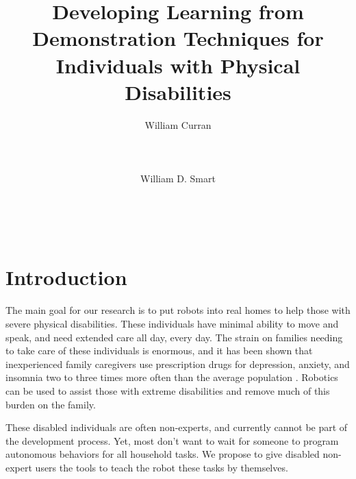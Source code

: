 \documentclass{sig-alternate}
\begin{document}

\title{Developing Learning from Demonstration Techniques for Individuals with Physical Disabilities}

\author{
  \alignauthor William Curran\\
    \\
    \\
    \\
  \alignauthor William D. Smart\\
    \\
    \\
    \\ 
}



\maketitle


\section{Introduction}
The main goal for our research is to put robots into real homes to help those with severe physical disabilities. These
individuals have minimal ability to move and speak, and need extended care all day, every day. The strain on families needing to take care of these individuals is enormous, and it has been shown that inexperienced family caregivers use prescription drugs for depression, anxiety, and insomnia two to three times more often than the average population \cite{Gallagher01081989}. Robotics can be used to assist those with extreme disabilities and remove much of this burden on the family.

These disabled individuals are often non-experts, and currently cannot be part of the development process. Yet, most don't want to wait for someone to program autonomous behaviors for all household tasks. We propose to give disabled non-expert users the tools to teach the robot these tasks by themselves. %
\end{document}
